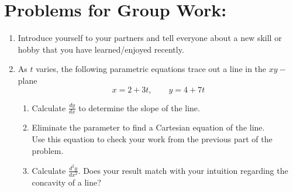 \section*{Problems for Group Work:}


\begin{enumerate}[{Problem} 1:]
\addtocounter{enumi}{-1}

\item Introduce yourself to your partners and tell everyone about a new skill or hobby that you have learned/enjoyed recently.

\vfill



\item As \(t\) varies, the following parametric equations trace out a line in the \(xy-\)plane
\[
x = 2 + 3t, \qquad y= 4+7t
\]
\begin{enumerate}
\item Calculate \(\frac{dy}{dx}\) to determine the slope of the line.
\item Eliminate the parameter to find a Cartesian equation of the line.\\ Use this equation to check your work from the previous part of the problem.
\item Calculate \(\frac{d^2y}{dx^2}\). Does your result match with your intuition regarding the concavity of a line?
\end{enumerate}

\vfill



\end{enumerate}
